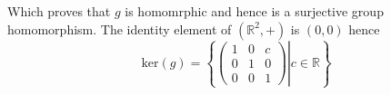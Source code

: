 \documentclass[11pt]{article}
\begin{document}
Which proves that $g$ is homomrphic and hence is a surjective group homomorphism.
The identity element of $(\mathbb{R}^2, +)$ is $(0,0)$ hence \\
\[
\text{ker}(g) = \left\{ \left. \begin{pmatrix}
1 & 0 & c \\
0 & 1 & 0 \\
0 & 0 & 1
\end{pmatrix}\right|c \in \mathbb{R}\right\}
\]
\end{document}
